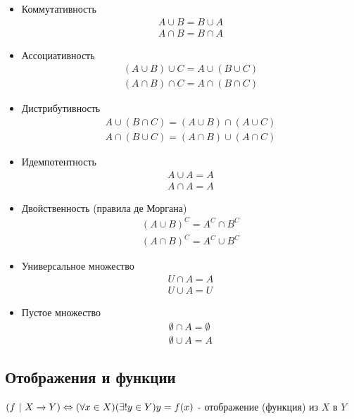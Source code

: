 \begin{itemize}
    \item Коммутативность
    \begin{align*}
        A \cup B = B \cup A \\
        A \cap B = B \cap A
    \end{align*}
    \item Ассоциативность
    \begin{align*}
        (A \cup B) \cup C = A \cup (B \cup C) \\
        (A \cap B) \cap C = A \cap (B \cap C)
    \end{align*}
    \item Дистрибутивность
    \begin{align*}
        A \cup (B \cap C) = (A \cup B) \cap (A \cup C) \\
        A \cap (B \cup C) = (A \cap B) \cup (A \cap C)
    \end{align*}
    \item Идемпотентность
    \begin{align*}
        A \cup A = A \\
        A \cap A = A
    \end{align*}
    \item Двойственность (правила де Моргана)
    \begin{align*}
        (A \cup B)^C = A^C \cap B^C \\
        (A \cap B)^C = A^C \cup B^C
    \end{align*}
    \item Универсальное множество
    \begin{align*}
        U \cap A = A \\
        U \cup A = U
    \end{align*}
    \item Пустое множество
    \begin{align*}
        \emptyset \cap A = \emptyset \\
        \emptyset \cup A = A
    \end{align*}
\end{itemize}


\subsection{Отображения и функции}

\begin{definition}
    $(f\ |\ X \xrightarrow{} Y) \Leftrightarrow (\forall x \in X)(\exists! y \in Y) y = f(x)$ - отображение (функция) из $X$ в $Y$
\end{definition}

